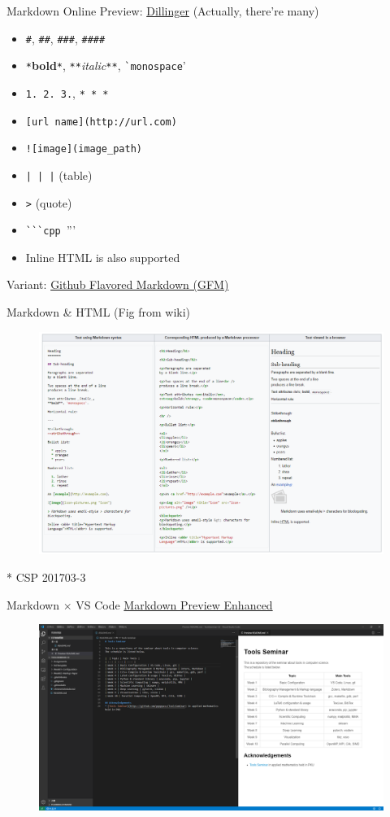 \documentclass{../TexTemplate/myslide}
\begin{document}
\begin{frame}[fragile]{Markdown}
Online Preview: \href{https://dillinger.io/}{Dillinger} (Actually, there're many)
\begin{itemize}
	\item \verb'#', \verb'##', \verb'###', \verb'####'
	\item \verb'*'\textbf{bold}\verb'*', \verb'**'\emph{italic}\verb'**', \verb'`monospace''
	\item \verb'1. 2. 3.', \verb'* * *'
	\item \verb'[url name](http://url.com)'
	\item \verb'![image](image_path)'
	\item \verb'| | |' (table)
	\item \verb'>' (quote)
	\item \verb'```cpp ''''
	\item Inline HTML is also supported
\end{itemize}
Variant: \href{https://github.github.com/gfm/}{Github Flavored Markdown (GFM)}
\end{frame}

\begin{frame}{Markdown \& HTML (Fig from wiki)}
\begin{figure}
\centering
\includegraphics[width=0.8\linewidth]{fig/markdown-http.png}
\end{figure}
* CSP 201703-3
\end{frame}

\begin{frame}{Markdown $\times$ VS Code}
\href{https://github.com/shd101wyy/vscode-markdown-preview-enhanced}{Markdown Preview Enhanced}
\begin{figure}
\centering
\includegraphics[width=\linewidth]{fig/markdown-preview.png}
\end{figure}
\end{frame}
\end{document}
